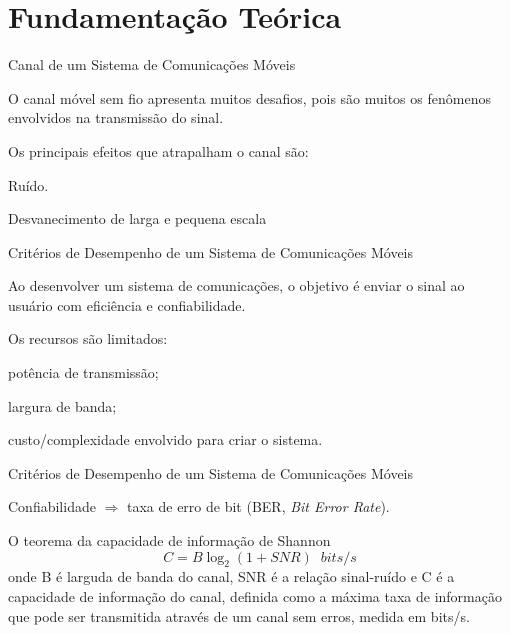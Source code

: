\section{Fundamentação Teórica}\label{sec:fund_teo}
\AtBeginSec

\begin{frame}{Canal de um Sistema de Comunicações Móveis}
 \begin{bigitem}
  \item O canal móvel sem fio apresenta muitos desafios, pois são muitos os fenômenos envolvidos na transmissão do sinal.
  \item Os principais efeitos que atrapalham o canal são:
  \begin{bigitem}
    \item Ruído.
    \item Desvanecimento de larga e pequena escala
  \end{bigitem}
 \end{bigitem}
\end{frame}


\begin{frame}{Critérios de Desempenho de um Sistema de Comunicações Móveis}
 \begin{bigitem}
  \item Ao desenvolver um sistema de comunicações, o objetivo é enviar o sinal ao usuário com eficiência e confiabilidade.
  \item Os recursos são limitados:
  \begin{bigitem}
    \item potência de transmissão;
    \item largura de banda;
    \item custo/complexidade envolvido para criar o sistema.
  \end{bigitem}
 \end{bigitem}
\end{frame}

\begin{frame}{Critérios de Desempenho de um Sistema de Comunicações Móveis}
 \begin{bigitem}
  \item Confiabilidade $\Rightarrow$ taxa de erro de bit (BER, \textit{Bit Error Rate}).
  \item O teorema da capacidade de informação de Shannon 
    \begin{equation}
     C = B\log_2\left(1 + SNR\right)\;\;bits/s
    \end{equation}
    onde B é larguda de banda do canal, SNR é a relação sinal-ruído e C é a capacidade de informação do canal, definida como a máxima taxa de informação que pode ser transmitida através de um canal sem erros, medida em bits/s.
 \end{bigitem}
\end{frame}

